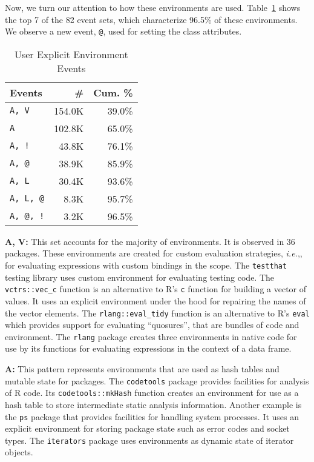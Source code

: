 \documentclass[10pt,review,sigplan,authorversion=true]{acmart}
\newcommand{\code}[1]{\lstinline |#1|\xspace}
\newcommand{\ie}{\emph{i.e.},\xspace}
\begin{document}
Now, we turn our attention to how these environments are used.
Table~\ref{table:user_explicit_env_seq} shows the top 7 of the 82 event sets,
which characterize 96.5\% of these environments. We observe a new event,
\texttt{@}, used for setting the class attributes.

\begin{table}[!h]
  \small
  \caption{User Explicit Environment Events} \label{table:user_explicit_env_seq}
  \centering
  \begin{tabular}{lrr}
    \toprule
    \textbf{Events}&\textbf{\#}&\textbf{Cum. \%}\\
    \midrule
    \texttt{A, V}&154.0K&39.0\%\\
    \texttt{A}&102.8K&65.0\%\\
    \texttt{A, !}&43.8K&76.1\%\\
    \texttt{A, @}&38.9K&85.9\%\\
    \texttt{A, L}&30.4K&93.6\%\\
    \texttt{A, L, @}&8.3K&95.7\%\\
    \texttt{A, @, !}&3.2K&96.5\%\\
    \bottomrule
  \end{tabular}
\end{table}

\noindent
\textbf{A, V:} This set accounts for the majority of environments. It is
observed in 36 packages. These environments are created for custom evaluation
strategies, \ie, for evaluating expressions with custom bindings in the scope.
The \code{testthat} testing library uses custom environment for evaluating
testing code. The \code{vctrs::vec_c} function is an alternative to R's \code{c}
function for building a vector of values. It uses an explicit environment under
the hood for repairing the names of the vector elements. The
\code{rlang::eval_tidy} function is an alternative to R's \code{eval} which
provides support for evaluating ``quosures'', that are bundles of code and
environment. The \code{rlang} package creates three environments in native code
for use by its functions for evaluating expressions in the context of a data
frame.

\noindent
\textbf{A:} This pattern represents environments that are used as hash tables
and mutable state for packages. The \code{codetools} package provides facilities
for analysis of R code. Its \code{codetools::mkHash} function creates an
environment for use as a hash table to store intermediate static analysis
information. Another example is the \code{ps} package that provides facilities
for handling system processes. It uses an explicit environment for storing
package state such as error codes and socket types. The \code{iterators} package
uses environments as dynamic state of iterator objects.
\end{document}
